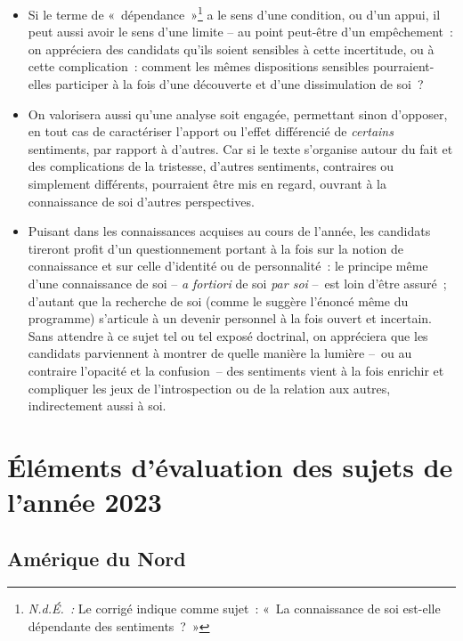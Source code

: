 {\begin{itemize}
\item Si le terme de «~dépendance~»\footnote{\textit{N.d.É.~:} Le corrigé indique comme sujet~: «~La connaissance de soi est-elle dépendante des sentiments~?~»{}} a le sens d'une condition, ou d'un appui, il peut
aussi avoir le sens d'une limite – au point peut-être d'un empêchement~: on
appréciera des candidats qu'ils soient sensibles à cette incertitude, ou à cette
complication~: comment les mêmes dispositions sensibles pourraient-elles
participer à la fois d'une découverte et d'une dissimulation de soi~?
\item On valorisera aussi qu'une analyse soit engagée, permettant sinon d'opposer,
en tout cas de caractériser l'apport ou l'effet différencié de \emph{certains} sentiments,
par rapport à d'autres. Car si le texte s'organise autour du fait et des
complications de la tristesse, d'autres sentiments, contraires ou simplement
différents, pourraient être mis en regard, ouvrant à la connaissance de soi
d'autres perspectives.
\item Puisant dans les connaissances acquises au cours de l'année, les candidats
tireront profit d'un questionnement portant à la fois sur la notion de
connaissance et sur celle d'identité ou de personnalité~: le principe même d'une
connaissance de soi – \emph{a fortiori} de soi \emph{par soi} –~est loin d'être assuré~; d'autant
que la recherche de soi (comme le suggère l'énoncé même du programme)
s'articule à un devenir personnel à la fois ouvert et incertain. Sans attendre à
ce sujet tel ou tel exposé doctrinal, on appréciera que les candidats parviennent
à montrer de quelle manière la lumière –~ou au contraire l'opacité et la confusion~– des sentiments vient à la fois enrichir et compliquer les jeux de l'introspection
ou de la relation aux autres, indirectement aussi à soi.
\end{itemize}}

\chapter*{Éléments d'évaluation des sujets de l'année 2023}

\section{Amérique du Nord}

